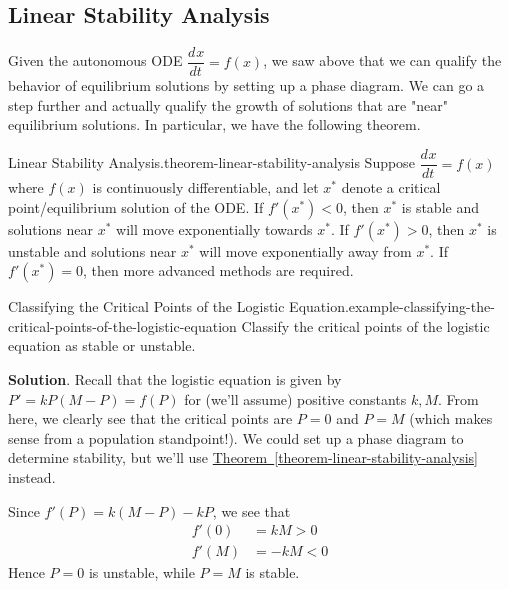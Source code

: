 \documentclass[10pt,]{book}
\numberwithin{equation}{section}
\newcommand{\dv}[3][]{\dfrac{d^{#1} #2}{d #3^{#1}}}
\newcommand{\lt}{<}
\newcommand{\gt}{>}
\begin{document}
\subsection[{Linear Stability Analysis}]{Linear Stability Analysis}\label{subsection-linear-stability-analysis}
\hypertarget{p-770}{}%
Given the autonomous ODE \(\dv{x}{t} = f(x)\), we saw above that we can qualify the behavior of equilibrium solutions by setting up a phase diagram. We can go a step further and actually qualify the growth of solutions that are "near" equilibrium solutions. In particular, we have the following theorem.%
\begin{theorem}{Linear Stability Analysis.}{}{theorem-linear-stability-analysis}%
\hypertarget{p-771}{}%
Suppose \(\dv{x}{t} = f(x)\) where \(f(x)\) is continuously differentiable, and let \(x^{*}\) denote a critical point/equilibrium solution of the ODE. If \(f'(x^{*}) \lt 0\), then \(x^{*}\) is stable and solutions near \(x^{*}\) will move exponentially towards \(x^{*}\). If \(f'(x^{*}) \gt 0\), then \(x^{*}\) is unstable and solutions near \(x^{*}\) will move exponentially away from \(x^{*}\). If \(f'(x^{*}) = 0\), then more advanced methods are required.%
\end{theorem}
\begin{example}{Classifying the Critical Points of the Logistic Equation.}{example-classifying-the-critical-points-of-the-logistic-equation}%
\hypertarget{p-772}{}%
Classify the critical points of the logistic equation as stable or unstable.%
\par\smallskip%
\noindent\textbf{Solution}.\hypertarget{solution-161}{}\quad%
\hypertarget{p-773}{}%
Recall that the logistic equation is given by \(P' = kP(M-P) = f(P)\) for (we'll assume) positive constants \(k,M\). From here, we clearly see that the critical points are \(P = 0\) and \(P = M\) (which makes sense from a population standpoint!). We could set up a phase diagram to determine stability, but we'll use \hyperref[theorem-linear-stability-analysis]{Theorem~\ref{theorem-linear-stability-analysis}} instead.%
\par
\hypertarget{p-774}{}%
Since \(f'(P) = k(M-P) - kP\), we see that%
\begin{align*}
f'(0) & = kM \gt 0\\
f'(M) & = -kM \lt 0 
\end{align*}
Hence \(P = 0\) is unstable, while \(P = M\) is stable.%
\end{example}
%
%
\typeout{************************************************}
\typeout{************************************************}
%
\end{document}
